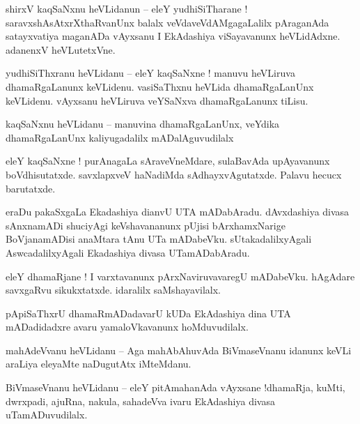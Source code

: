 \documentclass{article}
\begin{document}
\begin{mn}%
shirxV kaqSaNxnu heVLidanun -- eleY yudhiSiTharane ! saravxshAsAtxrXthaRvanUnx balalx 
veVdaveVdAMgagaLalilx pAraganAda satayxvatiya maganADa vAyxsanu I EkAdashiya viSayavanunx 
heVLidAdxne. adanenxV heVLutetxVne.
\end{mn}

\begin{mn}%
yudhiSiThxranu heVLidanu -- eleY kaqSaNxne ! manuvu heVLiruva dhamaRgaLanunx keVLidenu. vasiSaThxnu 
heVLida dhamaRgaLanUnx keVLidenu. vAyxsanu heVLiruva veYSaNxva dhamaRgaLanunx tiLisu.
\end{mn}

\begin{mn}%
kaqSaNxnu heVLidanu -- manuvina dhamaRgaLanUnx, veYdika dhamaRgaLanUnx kaliyugadalilx mADalAguvudilalx
\end{mn}

\begin{mn}%
eleY kaqSaNxne ! purAnagaLa sAraveVneMdare, sulaBavAda upAyavanunx boVdhisutatxde. savxlapxveV 
haNadiMda sAdhayxvAgutatxde. Palavu hecucx barutatxde.
\end{mn}

\begin{mn}%
eraDu pakaSxgaLa Ekadashiya dianvU UTA mADabAradu. dAvxdashiya divasa sAnxnamADi shuciyAgi 
keVshavananunx pUjisi bArxhamxNarige BoVjanamADisi anaMtara tAnu UTa mADabeVku. sUtakadalilxyAgali 
AswcadalilxyAgali Ekadashiya divasa UTamADabAradu.
\end{mn}

\begin{mn}%
eleY dhamaRjane ! I varxtavanunx pArxNaviruvavaregU mADabeVku. hAgAdare savxgaRvu sikukxtatxde. 
idaralilx saMshayavilalx.
\end{mn}

\begin{mn}%
pApiSaThxrU dhamaRmADadavarU kUDa EkAdashiya dina UTA mADadidadxre avaru yamaloVkavanunx 
hoMduvudilalx.
\end{mn}

\begin{mn}%
mahAdeVvanu heVLidanu -- Aga mahAbAhuvAda BiVmaseVnanu idanunx keVLi araLiya eleyaMte naDugutAtx 
iMteMdanu.
\end{mn}

\begin{mn}%
BiVmaseVnanu heVLidanu -- eleY pitAmahanAda vAyxsane !dhamaRja, kuMti, dwrxpadi, ajuRna, nakula, 
sahadeVva ivaru EkAdashiya divasa uTamADuvudilalx.
\end{mn}
\end{document}
